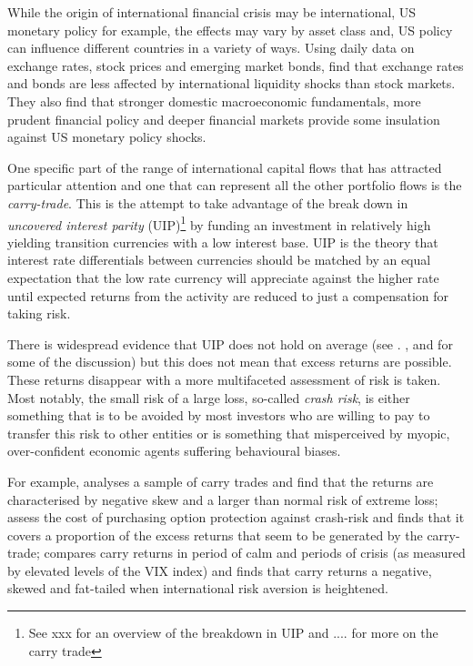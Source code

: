 \documentclass[12pt, a4paper, oneside]{article} %
\begin{document}
While the origin of international financial crisis may be international, US monetary policy for example, the effects may vary by asset class and, US policy can influence different countries in a variety of ways.  Using daily data on exchange rates, stock prices and emerging market bonds, \citet{Tapering} find that exchange rates and bonds are less affected by international liquidity shocks than stock markets.  They also find that stronger domestic macroeconomic fundamentals, more prudent financial policy and deeper financial markets provide some insulation against US monetary policy shocks.

One specific part of the range of international capital flows that has attracted particular attention and one  that can represent all the other portfolio flows is the \emph{carry-trade}.  This is the attempt to take advantage of the break down in \emph{uncovered interest parity} (UIP)\footnote{See xxx for an overview of the breakdown in UIP and .... for more on the carry trade} by funding an investment in relatively high yielding transition currencies with a low interest base.  UIP is the theory that interest rate differentials between currencies should be matched by an equal expectation that the low rate currency will appreciate against the higher rate until expected returns from the activity are reduced to just a compensation for taking risk. %

There is widespread evidence that UIP does not hold on average (see \citet{FrootAnomolies}. \citet{FrootFrankelFDB}, \citet{Hodrick1987} and \citet{SpronkEER} for some of the discussion) but this does not mean that excess returns are possible.  These returns disappear with a more multifaceted assessment of risk is taken.  Most notably, the small risk of a large loss, so-called \emph{crash risk}, is either something that is to be avoided by most investors who are willing to pay to transfer this risk to other entities or is something that misperceived by myopic, over-confident economic agents suffering behavioural biases.  

For example, \citet{BrunnermeierCarry} analyses a sample of carry trades and find that the returns are characterised by negative skew and a larger than normal risk of extreme loss; \citet{JurekCrash} assess the cost of purchasing option protection against crash-risk and finds that it covers a proportion of the excess returns that seem to be generated by the carry-trade; \citet{Hayward2013} compares carry returns in period of calm and periods of crisis (as measured by elevated levels of the VIX index) and finds that carry returns a negative, skewed and fat-tailed when international risk aversion is heightened.  
\end{document}
